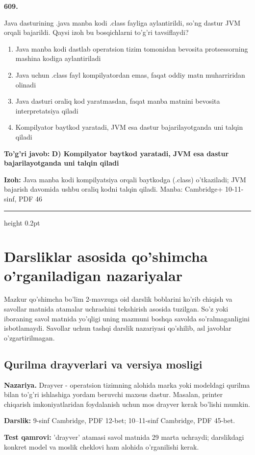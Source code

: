 \documentclass[10pt,a4paper]{article}
\begin{document}
{\bfseries\sffamily\color{ink} 609.}
\par
Java dasturining .java manba kodi .class fayliga aylantirildi, so'ng dastur JVM orqali bajarildi. Qaysi izoh bu bosqichlarni to'g'ri tavsiflaydi?
\begin{enumerate}[label=\Alph*),leftmargin=9mm]
\item Java manba kodi dastlab operatsion tizim tomonidan bevosita protsessorning mashina kodiga aylantiriladi
\item Java uchun .class fayl kompilyatordan emas, faqat oddiy matn muharriridan olinadi
\item Java dasturi oraliq kod yaratmasdan, faqat manba matnini bevosita interpretatsiya qiladi
\item Kompilyator baytkod yaratadi, JVM esa dastur bajarilayotganda uni talqin qiladi
\end{enumerate}
\begin{tcolorbox}[enhanced,breakable,colback=teal!4,colframe=teal!60!black,boxrule=0.45pt,arc=1.2mm,left=2.7mm,right=2.7mm,top=1.8mm,bottom=1.8mm,before skip=2mm,after skip=2mm]
{\bfseries\sffamily\color{teal}To'g'ri javob:} \textbf{D) Kompilyator baytkod yaratadi, JVM esa dastur bajarilayotganda uni talqin qiladi}
\par\smallskip
{\bfseries Izoh:} Java manba kodi kompilyatsiya orqali baytkodga (.class) o'tkaziladi; JVM bajarish davomida ushbu oraliq kodni talqin qiladi. Manba: Cambridge+ 10-11-sinf, PDF 46
\end{tcolorbox}
\vspace{2mm}\hrule height 0.2pt\vspace{3mm}
\clearpage\section{Darsliklar asosida qo'shimcha o'rganiladigan nazariyalar}
Mazkur qo'shimcha bo'lim 2-mavzuga oid darslik boblarini ko'rib chiqish va
savollar matnida atamalar uchrashini tekshirish asosida tuzilgan.
So'z yoki iboraning savol matnida yo'qligi uning mazmuni boshqa savolda
so'ralmaganligini isbotlamaydi. Savollar uchun tashqi darslik nazariyasi
qo'shilib, asl javoblar o'zgartirilmagan.
\subsection{Qurilma drayverlari va versiya mosligi}
\textbf{Nazariya.} Drayver - operatsion tizimning alohida marka yoki modeldagi qurilma bilan to'g'ri ishlashiga yordam beruvchi maxsus dastur. Masalan, printer chiqarish imkoniyatlaridan foydalanish uchun mos drayver kerak bo'lishi mumkin.
\par\textbf{Darslik:} 9-sinf Cambridge, PDF 12-bet; 10--11-sinf Cambridge, PDF 45-bet.
\par\textbf{Test qamrovi:} 'drayver' atamasi savol matnida 29 marta uchraydi; darslikdagi konkret model va moslik cheklovi ham alohida o'rganilishi kerak.
\end{document}
